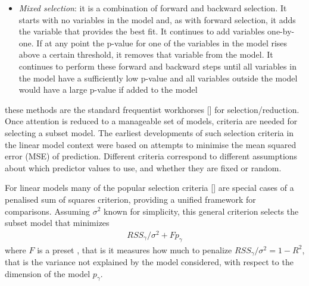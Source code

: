 \documentclass[11 pt]{article}
\begin{document}
\begin{multicols}{2}
\begin{itemize}
    \item \textit{Mixed selection}: it is a combination of forward and backward selection. It starts with no variables in the model and, as with forward selection, it adds the variable that provides the best fit. It continues to add variables one-by-one. If at any point the p-value for one of the variables in the model rises above a certain threshold, it removes that variable from the model. It continues to perform these forward and backward steps until all variables in the model have a sufficiently low p-value and all variables outside the model would have a large p-value if added to the model
\end{itemize}
these methods are the standard frequentist workhorses [\cite{CSI}] for selection/reduction. Once attention is reduced to a manageable set of models, criteria are needed for selecting a subset model. The earliest developments of such selection criteria in the linear model context were based on attempts to minimise the mean squared error (MSE) of prediction. Different criteria correspond to different assumptions about which predictor values to use, and whether they are fixed or random.

For linear models many of the popular selection criteria [\cite{George2000}] are special cases of a penalised sum of squares criterion, providing a unified framework for comparisons. Assuming $\sigma^2$ known for simplicity, this general criterion selects the subset model that minimizes
\begin{align}
    RSS_\gamma/\sigma^2 + F p_\gamma
\end{align}
where $F$ is a preset , that is it measures how much to penalize $RSS_\gamma/\sigma^2 = 1 - R^2$, that is the variance not explained by the model considered, with respect to the dimension of the model $p_\gamma$. 


\end{multicols}
\end{document}
